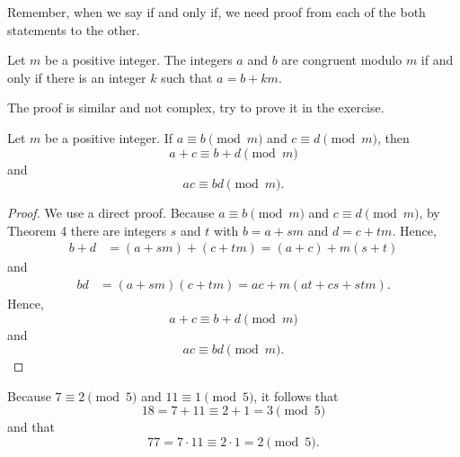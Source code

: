     \begin{remark}
        Remember, when we say if and only if, we need proof from each of the both statements to the other.
    \end{remark}
    \begin{theorem}\label{mod2}
        Let $m$ be a positive integer. The integers $a$ and $b$ are congruent modulo $m$ if and only if there is an integer $k$ such that $a = b + km$.
    \end{theorem}
    The proof is similar and not complex, try to prove it in the exercise.

    \begin{theorem}
        Let $m$ be a positive integer. If $a \equiv b \pmod{m}$ and $c \equiv d \pmod{m}$, then
        \begin{equation*}
            a + c \equiv b + d \pmod{m}
        \end{equation*}
        and
        \begin{equation*}
            ac \equiv bd \pmod{m}.
        \end{equation*}
        \end{theorem}
        
        \begin{proof}
        We use a direct proof. Because $a \equiv b \pmod{m}$ and $c \equiv d \pmod{m}$, by Theorem 4 there are integers $s$ and $t$ with $b = a + sm$ and $d = c + tm$. Hence,
        \begin{align*}
            b + d &= (a + sm) + (c + tm) = (a + c) + m(s + t)
        \end{align*}
        and
        \begin{align*}
            bd &= (a + sm)(c + tm) = ac + m(at + cs + stm).
        \end{align*}
        Hence,
        \begin{equation*}
            a + c \equiv b + d \pmod{m}
        \end{equation*}
        and
        \begin{equation*}
            ac \equiv bd \pmod{m}.
        \end{equation*}
        \end{proof}
        
        \begin{example}
        Because $7 \equiv 2 \pmod{5}$ and $11 \equiv 1 \pmod{5}$, it follows that
        \begin{equation*}
            18 = 7 + 11 \equiv 2 + 1 = 3 \pmod{5}
        \end{equation*}
        and that
        \begin{equation*}
            77 = 7 \cdot 11 \equiv 2 \cdot 1 = 2 \pmod{5}.
        \end{equation*}
        \end{example}

